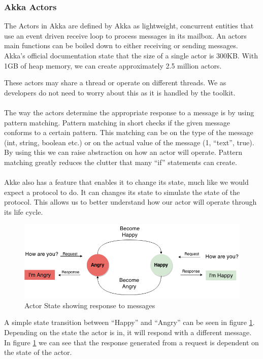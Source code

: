 \subsubsection{Akka Actors}
The Actors in Akka are defined by Akka as lightweight, concurrent entities that use an event driven receive loop to process messages in its mailbox. An actors main functions can be boiled down to either receiving or sending messages. Akka's official documentation state that the size of a single actor is 300KB. With 1GB of heap memory, we can create approximately 2.5 million actors. 

These actors may share a thread or operate on different threads. We as developers do not need to worry about this as it is handled by the toolkit.
\\\\
The way the actors determine the appropriate response to a message is by using pattern matching. Pattern matching in short checks if the given message conforms to a certain pattern. This matching can be on the type of the message (int, string, boolean etc.) or on the actual value of the message (1, ``text'', true). By using this we can raise abstraction on how an actor will operate. Pattern matching greatly reduces the clutter that many ``if'' statements can create.
\\\\
Akke also has a feature that enables it to change its state, much like we would expect a protocol to do. It can changes its state to simulate the state of the protocol. This allows us to better understand how our actor will operate through its life cycle.
\begin{figure}[h]
	\centering
	\includegraphics[scale=0.45]{images/tools/ActorState.png} 
	\caption{Actor State showing response to messages}
	\label{fig:ActorState}
\end{figure}
A simple state transition between ``Happy'' and ``Angry'' can be seen in figure \ref{fig:ActorState}. Depending on the state the actor is in, it will respond with a different message. In figure \ref{fig:ActorState} we can see that the response generated from a request is dependent on the state of the actor.


